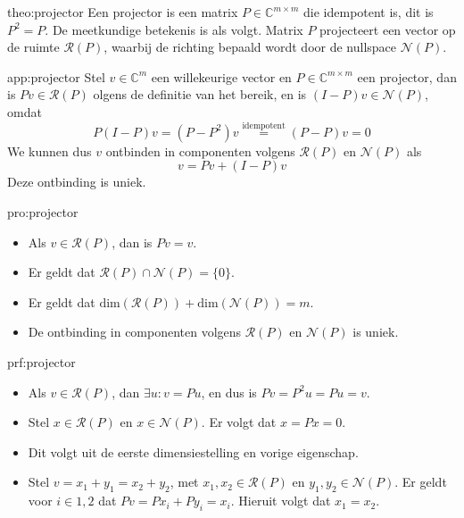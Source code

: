 \begin{theo}[Projector]{theo:projector}
    Een projector is een matrix $P \in \mathbb{C}^{m \times m}$ die idempotent is, dit is $P^2 = P$. De meetkundige betekenis is als volgt. Matrix $P$ projecteert een vector op de ruimte $\mathcal{R}(P)$, waarbij de richting bepaald wordt door de nullspace $\mathcal{N}(P)$. 
\end{theo}

\newpage

\begin{app}[Projector]{app:projector}
    Stel $v \in \mathbb{C}^m$ een willekeurige vector en $P \in \mathbb{C}^{m \times m}$ een projector, dan is $Pv \in \mathcal{R}(P)$ olgens de definitie van het bereik, en is $(I - P)v \in \mathcal{N}(P)$, omdat 
    \begin{equation*}
        P(I - P)v = (P - P^2)v \overset{\text{idempotent}}{=} (P-P)v = 0
    \end{equation*}
    We kunnen dus $v$ ontbinden in componenten volgens $\mathcal{R}(P)$ en $\mathcal{N}(P)$ als
    \begin{equation*}
        v = Pv + (I - P)v
    \end{equation*}
    Deze ontbinding is uniek.
\end{app}

\begin{pro}[Projector]{pro:projector}
    \begin{itemize}
        \item Als $v \in \mathcal{R}(P)$, dan is $Pv = v$.
        \item Er geldt dat $\mathcal{R}(P) \cap \mathcal{N}(P) = \{0\}$.
        \item Er geldt dat $\text{dim}(\mathcal{R}(P)) + \text{dim}(\mathcal{N}(P)) = m$.
        \item De ontbinding in componenten volgens $\mathcal{R}(P)$ en $\mathcal{N}(P)$ is uniek.
    \end{itemize}
\end{pro}

\begin{prf}[Projector]{prf:projector}
    \begin{itemize}
        \item Als $v \in \mathcal{R}(P)$, dan $\exists u: v = Pu$, en dus is $Pv = P^2u = Pu = v$.
        \item Stel $x \in \mathcal{R}(P)$ en $x \in \mathcal{N}(P)$. Er volgt dat $x = Px = 0$.
        \item Dit volgt uit de eerste dimensiestelling en vorige eigenschap.
        \item Stel $v = x_1 + y_1 = x_2 + y_2$, met $x_1, x_2 \in \mathcal{R}(P)$ en $y_1, y_2 \in \mathcal{N}(P)$. Er geldt voor $i \in {1,2}$ dat $Pv = Px_i + Py_i = x_i$. Hieruit volgt dat $x_1 = x_2$.
    \end{itemize}
\end{prf}

